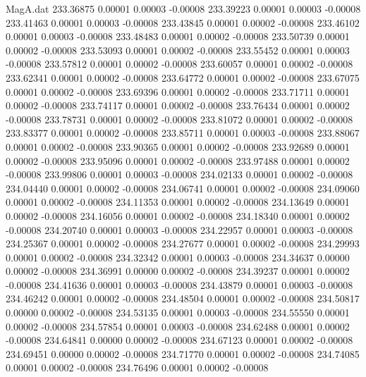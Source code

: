 \begin{filecontents}{MagA.dat}
 233.36875    0.00001    0.00003   -0.00008
 233.39223    0.00001    0.00003   -0.00008
 233.41463    0.00001    0.00003   -0.00008
 233.43845    0.00001    0.00002   -0.00008
 233.46102    0.00001    0.00003   -0.00008
 233.48483    0.00001    0.00002   -0.00008
 233.50739    0.00001    0.00002   -0.00008
 233.53093    0.00001    0.00002   -0.00008
 233.55452    0.00001    0.00003   -0.00008
 233.57812    0.00001    0.00002   -0.00008
 233.60057    0.00001    0.00002   -0.00008
 233.62341    0.00001    0.00002   -0.00008
 233.64772    0.00001    0.00002   -0.00008
 233.67075    0.00001    0.00002   -0.00008
 233.69396    0.00001    0.00002   -0.00008
 233.71711    0.00001    0.00002   -0.00008
 233.74117    0.00001    0.00002   -0.00008
 233.76434    0.00001    0.00002   -0.00008
 233.78731    0.00001    0.00002   -0.00008
 233.81072    0.00001    0.00002   -0.00008
 233.83377    0.00001    0.00002   -0.00008
 233.85711    0.00001    0.00003   -0.00008
 233.88067    0.00001    0.00002   -0.00008
 233.90365    0.00001    0.00002   -0.00008
 233.92689    0.00001    0.00002   -0.00008
 233.95096    0.00001    0.00002   -0.00008
 233.97488    0.00001    0.00002   -0.00008
 233.99806    0.00001    0.00003   -0.00008
 234.02133    0.00001    0.00002   -0.00008
 234.04440    0.00001    0.00002   -0.00008
 234.06741    0.00001    0.00002   -0.00008
 234.09060    0.00001    0.00002   -0.00008
 234.11353    0.00001    0.00002   -0.00008
 234.13649    0.00001    0.00002   -0.00008
 234.16056    0.00001    0.00002   -0.00008
 234.18340    0.00001    0.00002   -0.00008
 234.20740    0.00001    0.00003   -0.00008
 234.22957    0.00001    0.00003   -0.00008
 234.25367    0.00001    0.00002   -0.00008
 234.27677    0.00001    0.00002   -0.00008
 234.29993    0.00001    0.00002   -0.00008
 234.32342    0.00001    0.00003   -0.00008
 234.34637    0.00000    0.00002   -0.00008
 234.36991    0.00000    0.00002   -0.00008
 234.39237    0.00001    0.00002   -0.00008
 234.41636    0.00001    0.00003   -0.00008
 234.43879    0.00001    0.00003   -0.00008
 234.46242    0.00001    0.00002   -0.00008
 234.48504    0.00001    0.00002   -0.00008
 234.50817    0.00000    0.00002   -0.00008
 234.53135    0.00001    0.00003   -0.00008
 234.55550    0.00001    0.00002   -0.00008
 234.57854    0.00001    0.00003   -0.00008
 234.62488    0.00001    0.00002   -0.00008
 234.64841    0.00000    0.00002   -0.00008
 234.67123    0.00001    0.00002   -0.00008
 234.69451    0.00000    0.00002   -0.00008
 234.71770    0.00001    0.00002   -0.00008
 234.74085    0.00001    0.00002   -0.00008
 234.76496    0.00001    0.00002   -0.00008

\end{filecontents}
